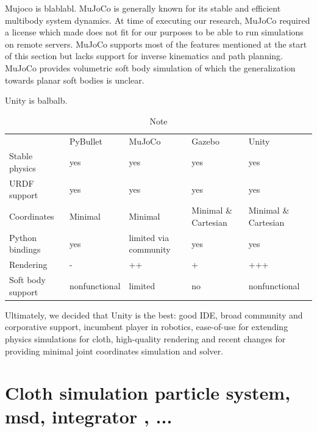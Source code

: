 \documentclass[\home/main.tex]{subfiles}
\begin{document}
Mujoco is blablabl. MuJoCo is generally known for its stable and efficient multibody system dynamics\autocite{Erez2015}.
At time of executing our research, MuJoCo required a license which made does not fit for our purposes to be able to run simulations on remote servers. 
MuJoCo supports most of the features mentioned at the start of this section but lacks support for inverse
kinematics and path planning.
MuJoCo provides volumetric soft body simulation of which the generalization towards planar soft bodies is unclear. 

Unity is balbalb. 


\begin{table}[]
    \begin{tabular}{lllll}
                    & PyBullet & MuJoCo & Gazebo & Unity \\
    Stable physics  &     yes     &  yes      &    yes    &  yes     \\
    URDF support    &      yes    &    yes    &    yes    &   yes    \\
    Coordinates     &  Minimal &  Minimal  & Minimal \& Cartesian       & Minimal \& Cartesian    \\
    Python bindings &    yes      &   limited via community     &    yes    &   yes   \\
    Rendering       &    -     &   ++     &   +     & +++ \\     
    Soft body support       &    nonfunctional     &   limited     &   no     & nonfunctional \\     

    \end{tabular}
    \caption{Note }
\end{table}

Ultimately, we decided that Unity is the best: good IDE, broad community and corporative support, incumbent player in robotics, ease-of-use for extending physics simulations for cloth, high-quality rendering and recent changes for providing minimal joint coordinates simulation and solver. 

\section{Cloth simulation \tiny{particle system, msd, integrator , ...} }

\end{document}
